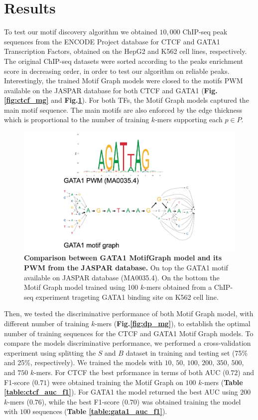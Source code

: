 \documentclass[a4paper, titlepage, openright]{book}
\begin{document}
\section{Results}
To test our motif discovery algorithm we obtained $10,000$ ChIP-seq peak sequences from the ENCODE Project database \citep{encode2012integrated} for CTCF and GATA1 Transcription Factors, obtained on the HepG2 and K562 cell lines, respectively. The original ChIP-seq datasets were sorted according to the peaks enrichment score in decreasing order, in order to test our algorithm on reliable peaks. Interestingly, the trained Motif Graph models were closed to the motifs PWM available on the JASPAR database \citep{sandelin2004jaspar} for both CTCF and GATA1 (\textbf{Fig.\ref{fig:ctcf_mg}} and \textbf{Fig.\ref{fig:gata1_mg}}). For both TFs, the Motif Graph models captured the main motif sequence. The main motifs are also enforced by the edge thickness which is proportional to the number of training $k$-mers supporting each $p \in P$.
\begin{figure}
	\centering
	\includegraphics[width=\textwidth]{figures/gata1_mg.jpg}
	\caption[Comparison between GATA1 Motif Graph model and its PWM from the JASPAR database.]{\textbf{Comparison between GATA1 MotifGraph model and its PWM from the JASPAR database.} On top the GATA1 motif available on JASPAR database (MA0035.4). On the bottom the Motif Graph model trained using 100 $k$-mers obtained from a ChIP-seq experiment trageting GATA1 binding site on K562 cell line.}
	\label{fig:gata1_mg}
\end{figure} 
Then, we tested the discriminative performance of both Motif Graph model, with different number of training $k$-mers (\textbf{Fig.\ref{fig:dp_mg}}), to establish the optimal number of training sequences for the CTCF and GATA1 Motif Graph models. To compare the models discriminative performance, we performed a cross-validation experiment using splitting the $S$ and $B$ dataset in training and testing set (75\% and 25\%, respectively). We trained the models with $10$, $50$, $100$, $200$, $350$, $500$, and $750$ $k$-mers. For CTCF the best prformance in terms of both AUC ($0.72$) and F1-score ($0.71$) were obtained training the Motif Graph on $100$ $k$-mers (\textbf{Table \ref{table:ctcf_auc_f1}}). For GATA1 the model returned the best AUC using $200$ $k$-mers ($0.76$), while the best F1-score ($0.70$) was obtained training the model with $100$ sequences (\textbf{Table \ref{table:gata1_auc_f1}}).
\end{document}

